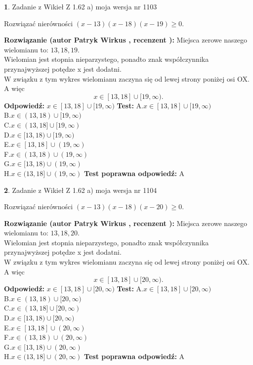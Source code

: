 \documentclass[12pt, a4paper]{article}
\theoremstyle{definition} %
\newtheorem{zad}{}
\newcommand{\zadStart}[1]{\begin{zad}#1\newline}
\newcommand{\zadStop}{\end{zad}}
\newcommand{\rozwStart}[2]{\noindent \textbf{Rozwiązanie (autor #1 , recenzent #2): }\newline}
\newcommand{\rozwStop}{\newline}
\newcommand{\odpStart}{\noindent \textbf{Odpowiedź:}\newline}
\newcommand{\odpStop}{\newline}
\newcommand{\testStart}{\noindent \textbf{Test:}\newline}
\newcommand{\testStop}{\newline}
\newcommand{\kluczStart}{\noindent \textbf{Test poprawna odpowiedź:}\newline}
\newcommand{\kluczStop}{\newline}
\begin{document}
\zadStart{Zadanie z Wikieł Z 1.62 a) moja wersja nr 1103}

Rozwiązać nierówności $(x-13)(x-18)(x-19)\ge0$.
\zadStop
\rozwStart{Patryk Wirkus}{}
Miejsca zerowe naszego wielomianu to: $13, 18, 19$.\\
Wielomian jest stopnia nieparzystego, ponadto znak współczynnika przy\linebreak najwyższej potędze x jest dodatni.\\ W związku z tym wykres wielomianu zaczyna się od lewej strony poniżej osi OX. A więc $$x \in [13,18] \cup [19,\infty).$$
\rozwStop
\odpStart
$x \in [13,18] \cup [19,\infty)$
\odpStop
\testStart
A.$x \in [13,18] \cup [19,\infty)$\\
B.$x \in (13,18) \cup [19,\infty)$\\
C.$x \in (13,18] \cup [19,\infty)$\\
D.$x \in [13,18) \cup [19,\infty)$\\
E.$x \in [13,18] \cup (19,\infty)$\\
F.$x \in (13,18) \cup (19,\infty)$\\
G.$x \in [13,18) \cup (19,\infty)$\\
H.$x \in (13,18] \cup (19,\infty)$
\testStop
\kluczStart
A
\kluczStop



\zadStart{Zadanie z Wikieł Z 1.62 a) moja wersja nr 1104}

Rozwiązać nierówności $(x-13)(x-18)(x-20)\ge0$.
\zadStop
\rozwStart{Patryk Wirkus}{}
Miejsca zerowe naszego wielomianu to: $13, 18, 20$.\\
Wielomian jest stopnia nieparzystego, ponadto znak współczynnika przy\linebreak najwyższej potędze x jest dodatni.\\ W związku z tym wykres wielomianu zaczyna się od lewej strony poniżej osi OX. A więc $$x \in [13,18] \cup [20,\infty).$$
\rozwStop
\odpStart
$x \in [13,18] \cup [20,\infty)$
\odpStop
\testStart
A.$x \in [13,18] \cup [20,\infty)$\\
B.$x \in (13,18) \cup [20,\infty)$\\
C.$x \in (13,18] \cup [20,\infty)$\\
D.$x \in [13,18) \cup [20,\infty)$\\
E.$x \in [13,18] \cup (20,\infty)$\\
F.$x \in (13,18) \cup (20,\infty)$\\
G.$x \in [13,18) \cup (20,\infty)$\\
H.$x \in (13,18] \cup (20,\infty)$
\testStop
\kluczStart
A
\kluczStop
\end{document}
